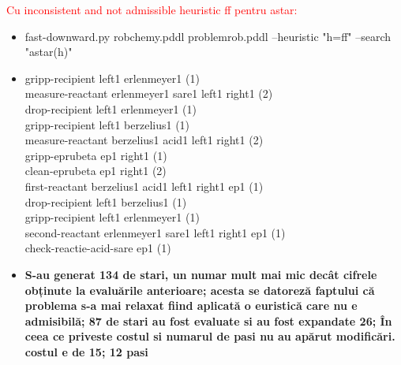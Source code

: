  \textcolor{red}{Cu inconsistent and not admissible heuristic ff pentru astar:}
   \begin{itemize}
    \setlength\itemsep{0em}
    \item   fast-downward.py robchemy.pddl problemrob.pddl --heuristic "h=ff" --search "astar(h)"
    \item gripp-recipient left1 erlenmeyer1 (1) \\
measure-reactant erlenmeyer1 sare1 left1 right1 (2)\\
drop-recipient left1 erlenmeyer1 (1)\\
gripp-recipient left1 berzelius1 (1)\\
measure-reactant berzelius1 acid1 left1 right1 (2)\\
gripp-eprubeta ep1 right1 (1)\\
clean-eprubeta ep1 right1 (2)\\
first-reactant berzelius1 acid1 left1 right1 ep1 (1)\\
drop-recipient left1 berzelius1 (1)\\
gripp-recipient left1 erlenmeyer1 (1)\\
second-reactant erlenmeyer1 sare1 left1 right1 ep1 (1)\\
check-reactie-acid-sare ep1 (1)
    \item \textbf{S-au generat 134 de stari, un numar mult mai mic decât cifrele obținute la evaluările anterioare; acesta se datoreză faptului că problema s-a mai relaxat fiind aplicată o euristică care nu e admisibilă; 87 de stari au fost evaluate si au fost expandate 26; În ceea ce priveste costul si numarul de pasi nu au apărut modificări. costul e de 15; 12 pasi}
\end{itemize}

